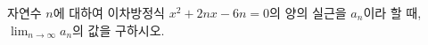 자연수 $n$에 대하여 이차방정식 $x^2+2nx-6n=0$의 양의 실근을 $a_n$이라 할 때, $\displaystyle\lim_{n\to\infty}a_n$의 값을 구하시오.

